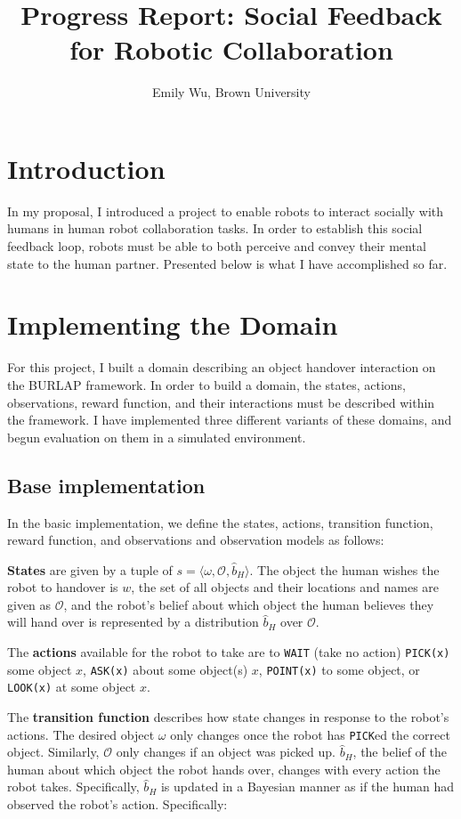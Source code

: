 \documentclass{article}
\title{Progress Report: Social Feedback for Robotic Collaboration}
\author{Emily Wu, Brown University}
\begin{document}
\maketitle

\section{Introduction} 

In my proposal, I introduced a project to enable robots to interact socially with humans in human robot collaboration tasks. In order to establish this social feedback loop, robots must be able to both perceive and convey their mental state to the human partner. Presented below is what I have accomplished so far. 

\section{Implementing the Domain}

For this project, I built a domain describing an object handover interaction on the BURLAP framework. In order to build a domain, the states, actions, observations, reward function, and their interactions must be described within the framework. I have implemented three different variants of these domains, and begun evaluation on them in a simulated environment. 

\subsection{Base implementation}

In the basic implementation, we define the states, actions, transition function, reward function, and observations and observation models as follows: 

\textbf{States} are given by a tuple of $ s = \langle \omega, \mathcal{O}, \hat b_H \rangle$. The object the human wishes the robot to handover is $w$, the set of all objects and their locations and names are given as $\mathcal{O}$, and the robot's belief about which object the human believes they will hand over is represented by a distribution $\hat b_H$ over $\mathcal{O}$. 

The \textbf{actions} available for the robot to take are to \texttt{WAIT} (take no action) \texttt{PICK(x)} some object $x$, \texttt{ASK(x)} about some object(s) $x$, \texttt{POINT(x)} to some object, or \texttt{LOOK(x)} at some object $x$. 

The \textbf{transition function} describes how state changes in response to the robot's actions. The desired object $\omega$ only changes once the robot has \texttt{PICK}ed the correct object. Similarly, $\mathcal{O}$ only changes if an object was picked up. $\hat b_H$, the belief of the human about which object the robot hands over, changes with every action the robot takes. Specifically, $\hat b_H$ is updated in a Bayesian manner as if the human had observed the robot's action. Specifically: 
\end{document}
